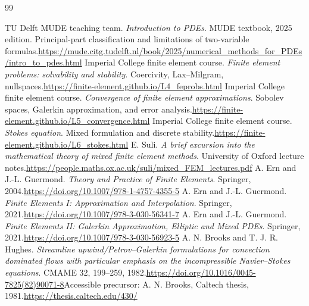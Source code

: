 \documentclass[11pt,a4paper]{article}
\begin{document}
\clearpage
\begin{thebibliography}{99}
\small\raggedright
{} TU Delft MUDE teaching team. \emph{Introduction to PDEs}. MUDE textbook, 2025 edition. Principal-part classification and limitations of two-variable formulas.\newline\url{https://mude.citg.tudelft.nl/book/2025/numerical_methods_for_PDEs/intro_to_pdes.html}
 Imperial College finite element course. \emph{Finite element problems: solvability and stability}. Coercivity, Lax--Milgram, nullspaces.\newline\url{https://finite-element.github.io/L4_feprobs.html}
 Imperial College finite element course. \emph{Convergence of finite element approximations}. Sobolev spaces, Galerkin approximation, and error analysis.\newline\url{https://finite-element.github.io/L5_convergence.html}
 Imperial College finite element course. \emph{Stokes equation}. Mixed formulation and discrete stability.\newline\url{https://finite-element.github.io/L6_stokes.html}
 E. Suli. \emph{A brief excursion into the mathematical theory of mixed finite element methods}. University of Oxford lecture notes.\newline\url{https://people.maths.ox.ac.uk/suli/mixed_FEM_lectures.pdf}
 A. Ern and J.-L. Guermond. \emph{Theory and Practice of Finite Elements}. Springer, 2004.\newline\url{https://doi.org/10.1007/978-1-4757-4355-5}
 A. Ern and J.-L. Guermond. \emph{Finite Elements I: Approximation and Interpolation}. Springer, 2021.\newline\url{https://doi.org/10.1007/978-3-030-56341-7}
 A. Ern and J.-L. Guermond. \emph{Finite Elements II: Galerkin Approximation, Elliptic and Mixed PDEs}. Springer, 2021.\newline\url{https://doi.org/10.1007/978-3-030-56923-5}
 A. N. Brooks and T. J. R. Hughes. \emph{Streamline upwind/Petrov--Galerkin formulations for convection dominated flows with particular emphasis on the incompressible Navier--Stokes equations}. CMAME 32, 199--259, 1982.\newline\url{https://doi.org/10.1016/0045-7825(82)90071-8}\newline Accessible precursor: A. N. Brooks, Caltech thesis, 1981.\newline\url{https://thesis.caltech.edu/430/}

\end{thebibliography}
\end{document}
